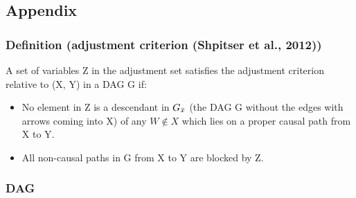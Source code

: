 \documentclass[
  12pt,
]{article}
\providecommand{\tightlist}{%
  \setlength{\itemsep}{0pt}\setlength{\parskip}{0pt}}
\begin{document}
\newpage

\hypertarget{appendix}{%
\subsection{Appendix}\label{appendix}}

\hypertarget{definition-adjustment-criterion-shpitser-et-al.-2012}{%
\subsubsection{Definition (adjustment criterion (Shpitser et al.,
2012))}\label{definition-adjustment-criterion-shpitser-et-al.-2012}}

A set of variables Z in the adjustment set satisfies the adjustment
criterion relative to (X, Y) in a DAG G if:

\begin{itemize}
\tightlist
\item
  No element in Z is a descendant in \(G_{\Bar{x}}\) (the DAG G without
  the edges with arrows coming into X) of any \(W \notin X\) which lies
  on a proper causal path from X to Y.
\item
  All non-causal paths in G from X to Y are blocked by Z.
\end{itemize}

\hypertarget{dag}{%
\subsubsection{DAG}\label{dag}}
\end{document}
